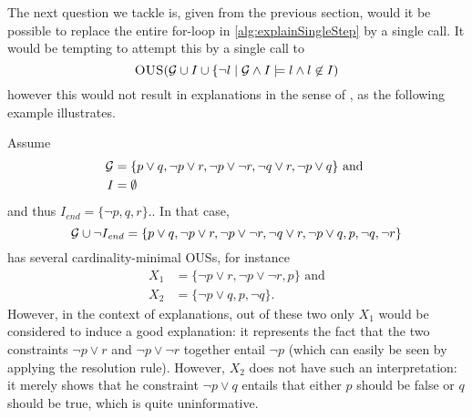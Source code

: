The next question we tackle is, given \fall from the previous section, would it be possible to replace the entire for-loop in \cref{alg:explainSingleStep} by a single \omus call.
It would be tempting to attempt this by a single call to 
\[\textsc{OUS}(\mathcal{G} \cup I\cup\{\lnot l\mid \mathcal{G}  \land I\models l\land l\not\in I)\]
however this would not result in explanations in the sense of \citet{ecai/BogaertsGCG20}, as the following example illustrates. 
\begin{example}
Assume \begin{align*}
         \mathcal{G}  &= \{p\lor q, \lnot p \lor r, \lnot p \lor \lnot r, \lnot q\lor r, \lnot p \lor q \}\text{ and }\\
         I &= \emptyset
       \end{align*}
       and thus
$         I_{\mathit{end}} = \{ \lnot p, q, r\}.
$. 
In that case, 
\[\mathcal{G} \cup \lnot I_{\mathit{end}} = \{p\lor q, \lnot p \lor r, \lnot p \lor \lnot r, \lnot q\lor r, \lnot p \lor q , p,\lnot q,\lnot r \}\]
has several cardinality-minimal OUSs, for instance 
\begin{align*}
X_1 &=    \{\lnot p \lor r, \lnot p \lor \lnot r, p\}\text{ and}\\
X_2 &= \{\lnot p \lor q ,  p, \lnot q\}.
\end{align*}
However, in the context of explanations, out of these two only $X_1$ would be considered to induce a good explanation: it represents the fact that the two constraints $\lnot p \lor r$ and $ \lnot p \lor \lnot r$ together entail $\lnot p$ (which can easily be seen by applying the resolution rule). However, $X_2$ does not have such an interpretation: it merely shows that he constraint $\lnot p \lor q$ entails that either $p$ should be false or $q$ should be true, which is quite uninformative. 
\end{example}
